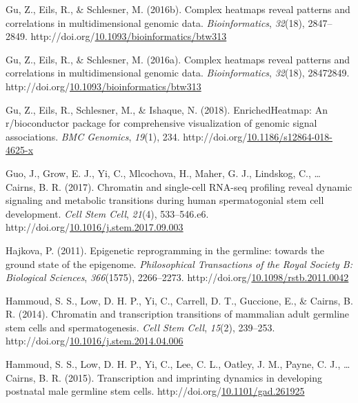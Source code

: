 \documentclass[12pt,twoside]{reedthesis}
\newlength{\cslhangindent}
\newenvironment{CSLReferences}[2] %
 {%
  \setlength{\parindent}{0pt}
  \ifodd #1 \everypar{\setlength{\hangindent}{\cslhangindent}}\ignorespaces\fi
  \ifnum #2 > 0
  \setlength{\parskip}{#2\baselineskip}
  \fi
 }%
 {}
\begin{document}
\begin{CSLReferences}{1}{0}
\leavevmode{}%
Gu, Z., Eils, R., \& Schlesner, M. (2016b). Complex heatmaps reveal patterns and correlations in multidimensional genomic data. \emph{Bioinformatics}, \emph{32}(18), 2847--2849. http://doi.org/\href{https://doi.org/10.1093/bioinformatics/btw313}{10.1093/bioinformatics/btw313}

\leavevmode{}%
Gu, Z., Eils, R., \& Schlesner, M. (2016a). Complex heatmaps reveal patterns and correlations in multidimensional genomic data. \emph{Bioinformatics}, \emph{32}(18), 28472849. http://doi.org/\href{https://doi.org/10.1093/bioinformatics/btw313}{10.1093/bioinformatics/btw313}

\leavevmode{}%
Gu, Z., Eils, R., Schlesner, M., \& Ishaque, N. (2018). EnrichedHeatmap: An r/bioconductor package for comprehensive visualization of genomic signal associations. \emph{BMC Genomics}, \emph{19}(1), 234. http://doi.org/\href{https://doi.org/10.1186/s12864-018-4625-x}{10.1186/s12864-018-4625-x}

\leavevmode{}%
Guo, J., Grow, E. J., Yi, C., Mlcochova, H., Maher, G. J., Lindskog, C., \ldots{} Cairns, B. R. (2017). Chromatin and single-cell RNA-seq profiling reveal dynamic signaling and metabolic transitions during human spermatogonial stem cell development. \emph{Cell Stem Cell}, \emph{21}(4), 533--546.e6. http://doi.org/\href{https://doi.org/10.1016/j.stem.2017.09.003}{10.1016/j.stem.2017.09.003}

\leavevmode{}%
Hajkova, P. (2011). Epigenetic reprogramming in the germline: towards the ground state of the epigenome. \emph{Philosophical Transactions of the Royal Society B: Biological Sciences}, \emph{366}(1575), 2266--2273. http://doi.org/\href{https://doi.org/10.1098/rstb.2011.0042}{10.1098/rstb.2011.0042}

\leavevmode{}%
Hammoud, S. S., Low, D. H. P., Yi, C., Carrell, D. T., Guccione, E., \& Cairns, B. R. (2014). Chromatin and transcription transitions of mammalian adult germline stem cells and spermatogenesis. \emph{Cell Stem Cell}, \emph{15}(2), 239--253. http://doi.org/\href{https://doi.org/10.1016/j.stem.2014.04.006}{10.1016/j.stem.2014.04.006}

\leavevmode{}%
Hammoud, S. S., Low, D. H. P., Yi, C., Lee, C. L., Oatley, J. M., Payne, C. J., \ldots{} Cairns, B. R. (2015). Transcription and imprinting dynamics in developing postnatal male germline stem cells. http://doi.org/\href{https://doi.org/10.1101/gad.261925}{10.1101/gad.261925}


\end{CSLReferences}
\end{document}
